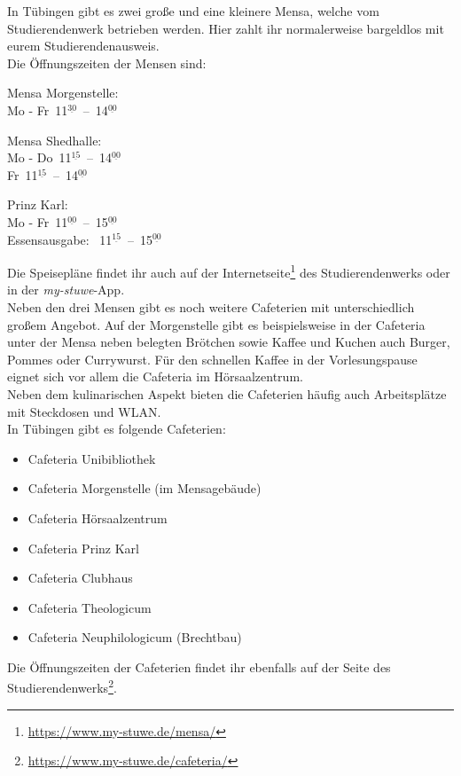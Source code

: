 
In Tübingen gibt es zwei große und eine kleinere Mensa, welche vom
Studierendenwerk betrieben werden. Hier zahlt ihr normalerweise bargeldlos mit
eurem Studierendenausweis.\\ Die Öffnungszeiten der Mensen sind:
\begin{center}

Mensa Morgenstelle:\\
Mo - Fr~11$^{\underline{30}}$~--~14$^{\underline{00}}$

\bigskip

Mensa Shedhalle:\\
Mo - Do~11$^{\underline{15}}$~--~14$^{\underline{00}}$\\
Fr~11$^{\underline{15}}$~--~14$^{\underline{00}}$

\nopagebreak
Prinz Karl:\\
Mo - Fr~11$^{\underline{00}}$~--~15$^{\underline{00}}$\\
Essensausgabe: ~11$^{\underline{15}}$~--~15$^{\underline{00}}$

\end{center}

Die Speisepläne findet ihr auch auf der
Internetseite\footnote{\url{https://www.my-stuwe.de/mensa/}} des
Studierendenwerks oder in der \emph{my-stuwe}-App.\\	%

Neben den drei Mensen gibt es noch weitere Cafeterien mit unterschiedlich
großem Angebot. Auf der Morgenstelle gibt es beispielsweise in der Cafeteria
unter der Mensa neben belegten Brötchen sowie Kaffee und Kuchen auch Burger,
Pommes oder Currywurst. Für den schnellen Kaffee in der Vorlesungspause eignet
sich vor allem die Cafeteria im Hörsaalzentrum.\\ Neben dem kulinarischen
Aspekt bieten die Cafeterien häufig auch Arbeitsplätze mit Steckdosen und
WLAN.\\
In Tübingen gibt es folgende Cafeterien:
\begin{itemize}
	\item Cafeteria Unibibliothek
	\item Cafeteria Morgenstelle (im Mensagebäude)
	\item Cafeteria Hörsaalzentrum
	\item Cafeteria Prinz Karl
	\item Cafeteria Clubhaus
	\item Cafeteria Theologicum
	\item Cafeteria Neuphilologicum (Brechtbau)
\end{itemize} Die Öffnungszeiten der Cafeterien findet ihr ebenfalls auf der
Seite des Studierendenwerks\footnote{\url{https://www.my-stuwe.de/cafeteria/}}.
